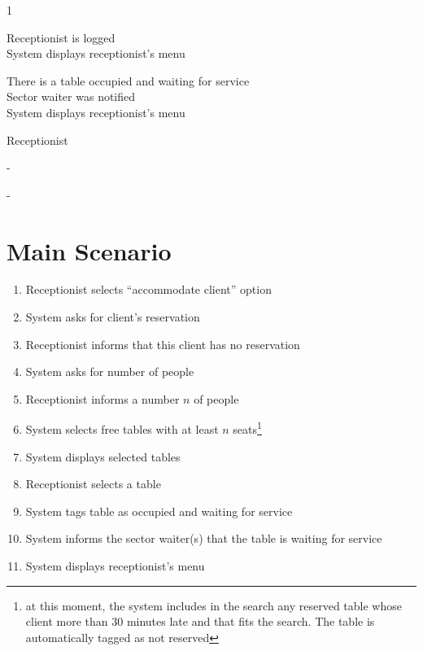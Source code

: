 \documentclass[a4paper,11pt,oneside]{book}
\newcommand{\menu}[1]{System displays #1's menu}
\begin{document}
\begin{description}[style=multiline,leftmargin=4cm]
  \item[Priority:] 1
  \item[Pre-conditions:] Receptionist is logged\\
    \menu{receptionist}
  \item[Post-conditions:] There is a table occupied and waiting for service\\
    Sector waiter was notified\\
    \menu{receptionist}
  \item[Primary Actor:] Receptionist
  \item[Other Actions:] -
  \item[Trigger:] -
\end{description}

\section{Main Scenario}

\begin{enumerate}
\item Receptionist selects ``accommodate client'' option
\item \label{accommodate:ask-reservation}System asks for client's reservation
\item \label{accommodate:noreservation}Receptionist informs that this client has no reservation
\item \label{accommodate:asknumber}System asks for number of people
\item \label{accommodate:inform-number}Receptionist informs a number $n$ of people
\item System selects free tables with at least $n$ seats\footnote{at this moment, the system includes in the search any reserved table whose client more than 30 minutes late and that fits the search. The table is automatically tagged as not reserved}
\item System displays selected tables
\item \label{accomodate:select-table}Receptionist selects a table
\item \label{accomodate:tag} System tags table as occupied and waiting for service
\item System informs the sector waiter(s) that the table is waiting for service
\item \menu{receptionist}
\end{enumerate}
\end{document}
